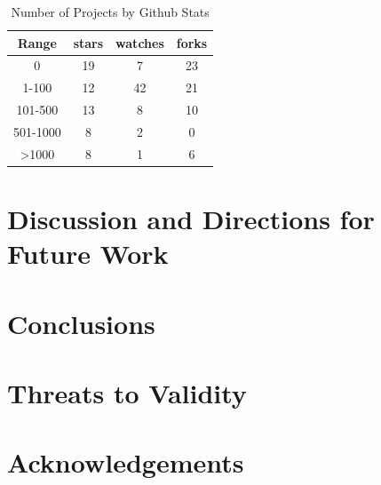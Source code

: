 \documentclass[sigconf]{acmart}
\begin{document}
\begin{table}
  \caption{Number of Projects by Github Stats}
  \label{tab:domain}
\begin{tabular}{ c c c c }
  \toprule
  Range & stars & watches & forks\\
  \midrule
  0			&19 & 7& 23\\
  1-100		&12 &42& 21\\
  101-500	&13 & 8& 10\\
  501-1000	& 8 & 2&  0\\
  >1000   	& 8 & 1&  6\\
  \bottomrule
\end{tabular}
\end{table}

\section{Discussion and Directions for Future Work}
\section{Conclusions}
\section*{Threats to Validity}
\section*{Acknowledgements}




\end{document}
